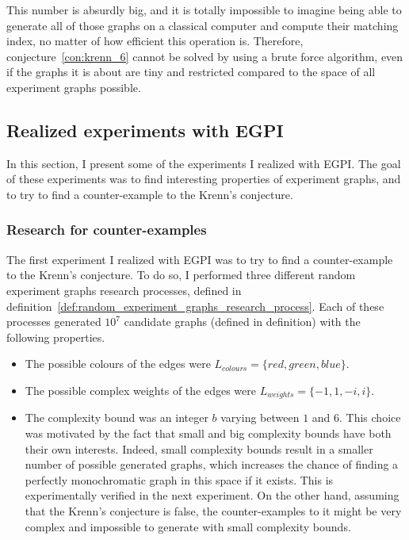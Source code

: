 This number is absurdly big, and it is totally impossible to imagine being able to generate all of those graphs on a classical computer and compute their matching index, no matter of how efficient this operation is.
Therefore, conjecture~\ref{con:krenn_6} cannot be solved by using a brute force algorithm, even if the graphs it is about are tiny and restricted compared to the space of all experiment graphs possible.


\subsection{Realized experiments with EGPI}
\label{subsec:realized_experiments}

In this section, I present some of the experiments I realized with EGPI. The goal of these experiments was to find interesting properties of experiment graphs, and to try to find a counter-example to the Krenn's conjecture.\\

\subsubsection{Research for counter-examples}

The first experiment I realized with EGPI was to try to find a counter-example to the Krenn's conjecture.
To do so, I performed three different random experiment graphs research processes, defined in definition~\ref{def:random_experiment_graphs_research_process}.
Each of these processes generated $10^7$ candidate graphs (defined in definition) with the following properties.

\begin{itemize}
    \item The possible colours of the edges were $L_{colours} = \{red, green, blue\}$.
    \item The possible complex weights of the edges were $L_{weights} = \{-1, 1, -i, i\}$.
    \item The complexity bound was an integer $b$ varying between $1$ and $6$.
        This choice was motivated by the fact that small and big complexity bounds have both their own interests.
        Indeed, small complexity bounds result in a smaller number of possible generated graphs, which increases the chance of finding a perfectly monochromatic graph in this space if it exists.
        This is experimentally verified in the next experiment.
        On the other hand, assuming that the Krenn's conjecture is false, the counter-examples to it might be very complex and impossible to generate with small complexity bounds.
\end{itemize}

